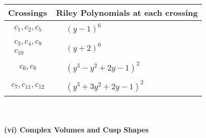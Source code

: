 \documentclass[1p]{elsarticle_modified}
\theoremstyle{definition}
\begin{document}
\begin{tabular}{m{50pt}|m{274pt}}
Crossings & \hspace{64pt}Riley Polynomials at each crossing \\
\hline $$\begin{aligned}c_{1},c_{2},c_{5}\end{aligned}$$&$\begin{aligned}
&(y-1)^6
\end{aligned}$\\
\hline $$\begin{aligned}c_{3},c_{4},c_{9}\\c_{10}\end{aligned}$$&$\begin{aligned}
&(y+2)^6
\end{aligned}$\\
\hline $$\begin{aligned}c_{6},c_{8}\end{aligned}$$&$\begin{aligned}
&(y^3- y^2+2 y-1)^2
\end{aligned}$\\
\hline $$\begin{aligned}c_{7},c_{11},c_{12}\end{aligned}$$&$\begin{aligned}
&(y^3+3 y^2+2 y-1)^2
\end{aligned}$\\
\hline
\end{tabular}\\~\\
\newpage\flushleft \textbf{(vi) Complex Volumes and Cusp Shapes}
\end{document}
